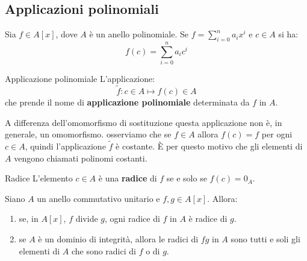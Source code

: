 \subsection{Applicazioni polinomiali}
Sia $f\in A[x]$, dove $A$ è un anello polinomiale. Se $f= \sum_{i=0}^{n} a_{i}x^{i}$ e $c \in A$ si ha:
\begin{displaymath}
	f(c) = \sum_{i=0}^{n} a_{i}c^{i}
\end{displaymath}

\begin{defbox}{Applicazione polinomiale}
	L'applicazione:
	\begin{equation}
		\widetilde{f} : c \in A \mapsto f(c) \in A
	\end{equation}
	che prende il nome di \textbf{applicazione polinomiale} determinata da $f$ in $A$.
\end{defbox}

\begin{osservation}
	A differenza dell'omomorfismo di sostituzione questa applicazione non è, in generale, un omomorfismo. osserviamo che se $f \in A$ allora $f(c)=f$ per ogni $c \in A$, quindi l'applicazione $\widetilde{f}$ è costante. È per questo motivo che gli elementi di $A$ vengono chiamati polinomi costanti.
\end{osservation}


\begin{defbox}{Radice}
	L'elemento $c \in A$ è una \textbf{radice} di $f$ se e solo se $f(c) = 0_{A}$.
\end{defbox}



\begin{lemmabox}\label{lemma:divisori_prodotto_polinomi}
	Siano $A$ un anello commutativo unitario e $f,g \in A[x]$. Allora:
	\begin{enumerate}
		\item se, in $A[x]$, $f$ divide $g$, ogni radice di $f$ in $A$ è radice di $g$.
		\item se $A$ è un dominio di integrità, allora le radici di $fg$ in $A$ sono tutti e soli gli elementi di $A$ che sono radici di $f$ o di $g$.
	\end{enumerate}
	
\end{lemmabox}

